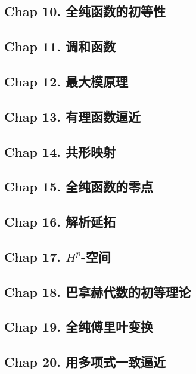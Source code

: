 \subsection{Chap 10. 全纯函数的初等性}

\subsection{Chap 11. 调和函数}

\subsection{Chap 12. 最大模原理}

\subsection{Chap 13. 有理函数逼近}

\subsection{Chap 14. 共形映射}

\subsection{Chap 15. 全纯函数的零点}

\subsection{Chap 16. 解析延拓}

\subsection{Chap 17. $H^p$-空间}

\subsection{Chap 18. 巴拿赫代数的初等理论}

\subsection{Chap 19. 全纯傅里叶变换}

\subsection{Chap 20. 用多项式一致逼近}
